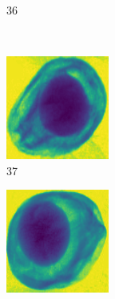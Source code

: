 \documentclass[11pt]{article}
\begin{document}
\begin{figure}[!h]
\begin{subfigure}[b]{0.22\textwidth}
         \caption{36}
         \label{fig:avo_35}
     \end{subfigure}
                    \\
    \begin{subfigure}[b]{0.22\textwidth}
         \centering
         \includegraphics[width=\textwidth]{figurer/avocado_dataset/avo_36.jpg}
         \caption{37}
         \label{fig:avo_36}
     \end{subfigure}
     \hfill
     \begin{subfigure}[b]{0.22\textwidth}
         \centering
         \includegraphics[width=\textwidth]{figurer/avocado_dataset/avo_37.jpg}

\end{subfigure}
\end{figure}
\end{document}
